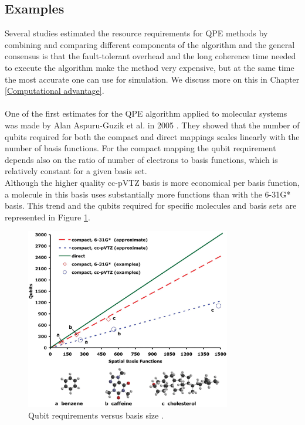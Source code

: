 \subsection{Examples}
Several studies estimated the resource requirements for QPE methods by combining and comparing different components of the algorithm and the general consensus is that the fault-tolerant overhead and the long coherence time needed to execute the algorithm make the method very expensive, but at the same time the most accurate one can use for simulation. We discuss more on this in Chapter \ref{Computational advantage}. \\
\\
One of the first estimates for the QPE algorithm applied to molecular systems was made by Alan Aspuru-Guzik et al. in 2005 \cite{Aspuru-Guzik2005Sep}. They showed that the number of qubits required for both the compact and direct mappings scales linearly with the number of basis functions. For the compact mapping the qubit requirement depends also on the ratio of number of electrons to basis functions, which is relatively constant for a given basis set. \\
Although the higher quality cc-pVTZ basis is more economical per basis function, a molecule in this basis uses substantially more functions than with the 6-31G* basis. This trend and the qubits required for specific molecules and basis sets are represented in Figure \ref{Aspuru-Guzik}. \\
\begin{figure}[ht]
  \centering
  \includegraphics[width=0.8\textwidth]{figures/Aspuru-Guzik.jpeg}
  \caption{Qubit requirements versus basis size \cite{Aspuru-Guzik2005Sep}.} \label{Aspuru-Guzik}
\end{figure} \\
